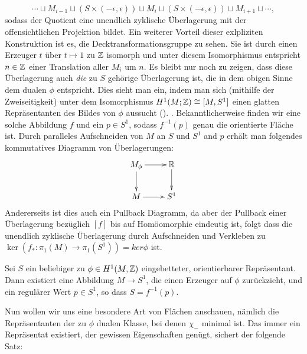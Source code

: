 \begin{bem}
	\[
		\cdots \sqcup M_{i-1} \sqcup (S \times (-\epsilon,\epsilon)) \sqcup M_i \sqcup  (S \times (-\epsilon,\epsilon)) \sqcup M_{i+1} \sqcup \cdots,
	\]
	sodass der Quotient eine unendlich zyklische Überlagerung mit der offensichtlichen Projektion bildet. Ein weiterer Vorteil dieser exlpliziten Konstruktion ist es, die Decktransformationsgruppe zu sehen. Sie ist durch einen Erzeuger $t$ über $t\mapsto 1$ zu $\mathbb{Z}$ isomorph und unter diesem Isomorphismus entspricht $n\in \mathbb{Z}$ einer Translation aller $M_i$ um $n$. Es bleibt nur noch zu zeigen, dass diese Überlagerung auch \textit{die} zu $S$ gehörige Überlagerung ist, die in dem obigen Sinne dem dualen $\phi$ entspricht. Dies sieht man ein, indem man sich (mithilfe der Zweiseitigkeit) unter dem Isomorphismus $H^1(M;\mathbb{Z})\cong [M,S^1]$ einen glatten Repräsentanten des Bildes von $\phi$ aussucht (). . Bekanntlicherweise finden wir eine solche Abbildung $f$ und ein $p \in S^1$, sodass $f^{-1}(p)$ genau die orientierte Fläche ist. Durch paralleles Aufschneiden von $M$ an $S$ und $S^1$ and $p$ erhält man folgendes kommutatives Diagramm von Überlagerungen:
	\[
		\begin{xy}
			\xymatrix{M_\phi \ar[r] \ar[d] &\RR \ar[d]\\
						M \ar[r]& S^1}
		\end{xy}
	\]
	Andererseits ist dies auch ein Pullback Diagramm, da aber der Pullback einer Überlagerung bezüglich $[f]$ bis auf Homöomorphie eindeutig ist, folgt dass die unendlich zyklische Überlagerung durch Aufschneiden und Verkleben zu $\ker(f_*:\pi_1(M)\to\pi_1(S^1)) = ker\phi$ ist.
\end{bem}

\begin{bem}
	\label{constr:presurf}
	Sei $S$ ein beliebiger zu $\phi \in H^1(M,\mathbb{Z})$ eingebetteter, orientierbarer Repräsentant. Dann existiert eine Abbildung $M \to S^1$, die einen Erzeuger auf $\phi$ zurückzieht, und ein regulärer Wert $p \in S^1$, so dass $S=f^{-1}(p)$. 
\end{bem}

Nun wollen wir uns eine besondere Art von Flächen anschauen, nämlich die Repräsentanten der zu $\phi$ dualen Klasse, bei denen $\chi_-$ minimal ist. Das immer ein Repräsentat existiert, der gewissen Eigenschaften genügt, sichert der folgende Satz:

